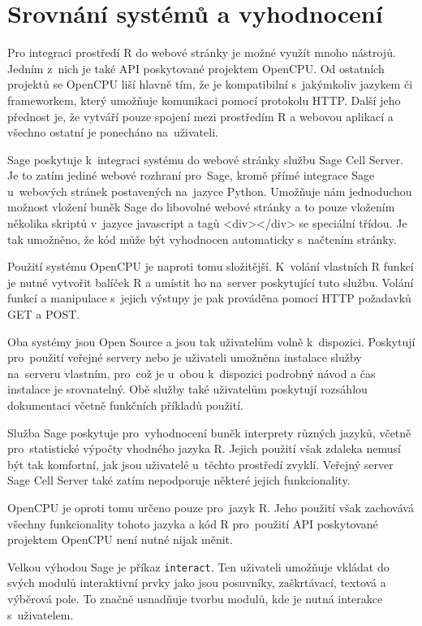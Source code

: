 \documentclass[thesis=B,czech]{FITthesis}[2012/06/26]
\begin{document}
\section{Srovnání systémů a vyhodnocení}
Pro integraci prostředí R do webové stránky je možné využít mnoho nástrojů. Jedním z~nich je také API poskytované projektem OpenCPU. Od ostatních projektů se OpenCPU liší hlavně tím, že je kompatibilní s~jakýmkoliv jazykem či frameworkem, který umožňuje komunikaci pomocí protokolu HTTP. Další jeho přednost je, že vytváří pouze spojení mezi prostředím R a webovou aplikací a všechno ostatní je ponecháno na~uživateli. 

Sage poskytuje k~integraci systému do webové stránky službu Sage Cell Server. Je to zatím jediné webové rozhraní pro~Sage, kromě přímé integrace Sage u~webových stránek postavených na~jazyce Python. Umožňuje nám jednoduchou možnost vložení buněk Sage do libovolné webové stránky a to pouze vložením několika skriptů v~jazyce javascript a tagů <div></div> se speciální třídou. Je tak umožněno, že kód může být vyhodnocen automaticky s~načtením stránky.

Použití systému OpenCPU je naproti tomu složitější. K~volání vlastních R funkcí je nutné vytvořit balíček R a umístit ho na~server poskytující tuto službu. Volání funkcí a manipulace s~jejich výstupy je pak prováděna pomocí HTTP požadavků GET a POST.

Oba systémy jsou Open Source a jsou tak uživatelům volně k~dispozici. Poskytují pro~použití veřejné servery nebo je uživateli umožněna instalace služby na~serveru vlastním, pro~což je u~obou k~dispozici podrobný návod a čas instalace je srovnatelný. Obě služby také uživatelům poskytují rozsáhlou dokumentaci včetně funkčních příkladů použití.

Služba Sage poskytuje pro~vyhodnocení buněk interprety různých jazyků, včetně pro~statistické výpočty vhodného jazyka R. Jejich použití však zdaleka nemusí být tak komfortní, jak jsou uživatelé u~těchto prostředí zvyklí. Veřejný server Sage Cell Server také zatím nepodporuje některé jejich funkcionality. 

OpenCPU je oproti tomu určeno pouze pro~jazyk R. Jeho použití však zachovává všechny funkcionality tohoto jazyka a kód R pro~použití API poskytované projektem OpenCPU není nutné nijak měnit.

Velkou výhodou Sage je příkaz \texttt{interact}. Ten uživateli umožňuje vkládat do svých modulů interaktivní prvky jako jsou posuvníky, zaškrtávací, textová a výběrová pole. To značně usnadňuje tvorbu modulů, kde je nutná interakce s~uživatelem.
\end{document}
